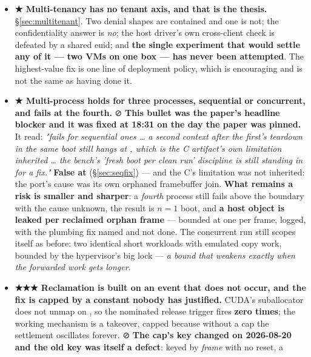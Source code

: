 \documentclass[10.5pt]{article}
\begin{document}
\begin{itemize}
  suspect that the next commit retired.  — a document whose entire job is
  to say what is built — is now wholly stale, and this paper stopped citing it rather than
  laundering numbers through it. \textbf{No gate covers prose}, which is why
  \S\ref{sec:corrections} keeps growing.
\item \textbf{★ Multi-tenancy has no tenant axis, and that is the thesis.} \S\ref{sec:multitenant}.
  Two denial shapes are contained and one is not; the confidentiality answer is \emph{no}; the
  host driver's own cross-client check is defeated by a shared euid; and \textbf{the single
  experiment that would settle any of it — two VMs on one box — has never been attempted}. The
  highest-value fix is one line of deployment policy, which is encouraging and is not the same as
  having done it.
\item \textbf{★ Multi-process holds for three processes, sequential or concurrent, and fails at
  the fourth.} ⊘ \textbf{This bullet was the paper's headline blocker and it was fixed at 18:31 on
  the day the paper was pinned.} It read: \emph{"fails for sequential ones \dots{} a second
  context after the first's teardown in the same boot still hangs at , which is
  the C artifact's own limitation inherited \dots{} the bench's 'fresh boot per clean run'
  discipline is still standing in for a fix."} \textbf{False at }
  (\S\ref{sec:seqfix}) --- and the C's limitation was not inherited: the port's cause was its own
  orphaned framebuffer join. \textbf{What remains a risk is smaller and sharper}: a
  \emph{fourth} process still fails above the  boundary with the cause unknown, the
  result is $n = 1$ boot, and \textbf{a host object is leaked per reclaimed orphan frame} ---
  bounded at one per frame, logged, with the plumbing fix named and not done. The concurrent run
  still scopes itself as before: two identical short workloads with emulated copy work, bounded by
  the hypervisor's big lock — \emph{a bound that weakens exactly when the forwarded work gets
  longer}.
\item \textbf{★★★ Reclamation is built on an event that does not occur, and the fix is capped by
  a constant nobody has justified.} CUDA's suballocator does not unmap on , so the
  nominated release trigger fires \textbf{zero times}; the working mechanism is a takeover, capped
  because without a cap the settlement oscillates forever. ⊘ \textbf{The cap's key changed on
  2026-08-20 and the old key was itself a defect}: keyed by \emph{frame} with no reset, a

\end{itemize}
\end{document}
